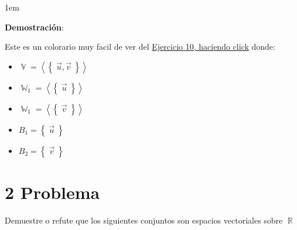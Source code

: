 \documentclass[12pt, fleqn]{article}                             %
\newenvironment{SmallIndentation}[1][0.75em]                    %
        {\begin{adjustwidth}{#1}{}\begin{footnotesize}}             %
        {\end{footnotesize}\end{adjustwidth}}                       %
\theoremstyle{break}                                            %
\DeclareMathOperator \Reals        {\mathbb{R}}                 %
\DeclareMathOperator \VectorSet    {\mathbb{V}}                 %
\DeclareMathOperator \SubVectorSet {\mathbb{W}}                 %
\newcommand{\Set}[1]    {\left\{ \; #1 \; \right\}}             %
\newcommand{\Wrap}[1]    {\left( #1 \right)}                    %
\newcommand{\Generate}[1]{\left\langle #1 \right\rangle}        %
\begin{document}
    \begin{SmallIndentation}[1em]
        \textbf{Demostración}:
        
        Este es un colorario muy facil de ver del \hyperref[sec:10]{\underline{Ejercicio 10, haciendo click}}
        donde:
        \begin{itemize}
            \item $\VectorSet = \Generate{\Set{\vec u, \vec v}}$
            \item $\SubVectorSet_1 = \Generate{\Set{\vec u}}$
            \item $\SubVectorSet_1 = \Generate{\Set{\vec v}}$
            \item $B_1 = \Set{\vec u}$
            \item $B_2 = \Set{\vec v}$
        \end{itemize}
    
    \end{SmallIndentation}
        


\clearpage
\section{2 Problema}

    Demuestre o refute que los siguientes conjuntos son espacios vectoriales
    sobre $\Reals$
\end{document}
